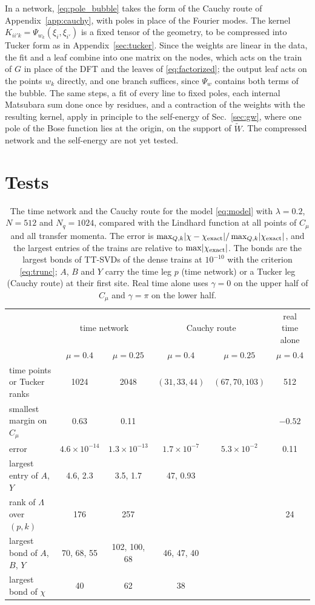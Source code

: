 \documentclass[aps,prb,reprint,a4paper]{revtex4-2}
\begin{document}
In a network, \eqref{eq:pole_bubble} takes the form of the Cauchy route of Appendix~\ref{app:cauchy}, with poles in place of the Fourier modes. The kernel $K_{ii'k}=\Psi_{w_k}(\xi_i,\xi_{i'})$ is a fixed tensor of the geometry, to be compressed into Tucker form as in Appendix~\ref{sec:tucker}. Since the weights are linear in the data, the fit and a leaf combine into one matrix on the nodes, which acts on the train of $G$ in place of the DFT and the leaves of \eqref{eq:factorized}; the output leaf acts on the points $w_k$ directly, and one branch suffices, since $\Psi_w$ contains both terms of the bubble. The same steps, a fit of every line to fixed poles, each internal Matsubara sum done once by residues, and a contraction of the weights with the resulting kernel, apply in principle to the self-energy of Sec.~\ref{sec:gw}, where one pole of the Bose function lies at the origin, on the support of $\tilde W$. The compressed network and the self-energy are not yet tested.

\section{Tests}
\label{sec:tests}

\begin{table}[t]
\caption{The time network and the Cauchy route for the model \eqref{eq:model} with $\lambda=0.2$, $N=512$ and $N_q=1024$, compared with the Lindhard function at all points of $C_\mu$ and all transfer momenta. The error is $\max_{Q,k}\lvert\chi-\chi_{\rm exact}\rvert/\max_{Q,k}\lvert\chi_{\rm exact}\rvert$, and the largest entries of the trains are relative to $\max\lvert\chi_{\rm exact}\rvert$. The bonds are the largest bonds of TT-SVDs of the dense trains at $10^{-10}$ with the criterion \eqref{eq:trunc}; $A$, $B$ and $Y$ carry the time leg $p$ (time network) or a Tucker leg (Cauchy route) at their first site. Real time alone uses $\gamma=0$ on the upper half of $C_\mu$ and $\gamma=\pi$ on the lower half.}
\label{tab:time}
\centering\small
\setlength{\tabcolsep}{6pt}
\begin{tabular}{@{}lccccc@{}}
\toprule
 & \multicolumn{2}{c}{time network} & \multicolumn{2}{c}{Cauchy route} & real time alone \\
 & $\mu=0.4$ & $\mu=0.25$ & $\mu=0.4$ & $\mu=0.25$ & $\mu=0.4$ \\
\midrule
time points or Tucker ranks & 1024 & 2048 & $(31,33,44)$ & $(67,70,103)$ & 512 \\
smallest margin on $C_\mu$ & 0.63 & 0.11 & & & $-0.52$ \\
error & $4.6\times10^{-14}$ & $1.3\times10^{-13}$ & $1.7\times10^{-7}$ & $5.3\times10^{-2}$ & 0.11 \\
largest entry of $A$, $Y$ & 4.6, 2.3 & 3.5, 1.7 & 47, 0.93 & & \\
rank of $\Lambda$ over $(p,k)$ & 176 & 257 & & & 24 \\
largest bond of $A$, $B$, $Y$ & 70, 68, 55 & 102, 100, 68 & 46, 47, 40 & & \\
largest bond of $\chi$ & 40 & 62 & 38 & & \\
\bottomrule
\end{tabular}
\end{table}
\end{document}
